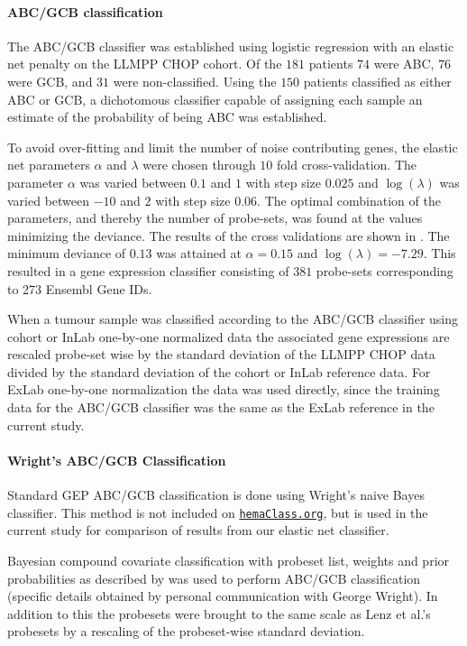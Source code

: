 \documentclass[10pt,letterpaper]{article}
\newcommand{\hemaClass}{\href{http://hemaClass.org}{\texttt{hemaClass.org}}}
\begin{document}
\paragraph{ABC/GCB classification}
The ABC/GCB classifier was established using logistic regression with an elastic net penalty on the LLMPP CHOP cohort.
Of the $181$ patients $74$ were ABC, $76$ were GCB, and $31$ were non-classified.
Using the $150$ patients classified as either ABC or GCB, a dichotomous classifier capable of assigning each sample an estimate of the probability of being ABC was established.

To avoid over-fitting and limit the number of noise contributing genes, the elastic net parameters $\alpha$ and $\lambda$ were chosen through $10$ fold cross-validation.
The parameter $\alpha$ was varied between $0.1$ and $1$ with step size $0.025$ and $\log(\lambda)$ was varied between $-10$ and $2$ with step size $0.06$.
The optimal combination of the parameters, and thereby the number of probe-sets, was found at the values minimizing the deviance.
The results of the cross validations are shown in .
The minimum deviance of $0.13$ was attained at $\alpha = 0.15$ and $\log(\lambda) = -7.29$. This resulted in a gene expression classifier consisting of $381$ probe-sets corresponding to 273 Ensembl Gene IDs.

When a tumour sample was classified according to the ABC/GCB classifier using cohort or InLab one-by-one normalized data the associated gene expressions are rescaled probe-set wise by the standard deviation of the LLMPP CHOP data divided by the standard deviation of the cohort or InLab reference data. For ExLab one-by-one normalization the data was used directly, since the training data for the ABC/GCB classifier was the same as the ExLab reference in the current study.

\paragraph{Wright's ABC/GCB Classification}
Standard GEP ABC/GCB classification is done using Wright's naive Bayes classifier. This method is not included on \hemaClass{}, but is used in the current study for comparison of results from our elastic net classifier.

Bayesian compound covariate classification \cite{Wright2003} with probeset list, weights and prior probabilities as described by \cite{Lenz2008a} was used to perform ABC/GCB classification (specific details obtained by personal communication with George Wright). In addition to this the probesets were brought to the same scale as Lenz et al.'s \cite{Lenz2008a} probesets by a rescaling of the probeset-wise standard deviation.
\end{document}
